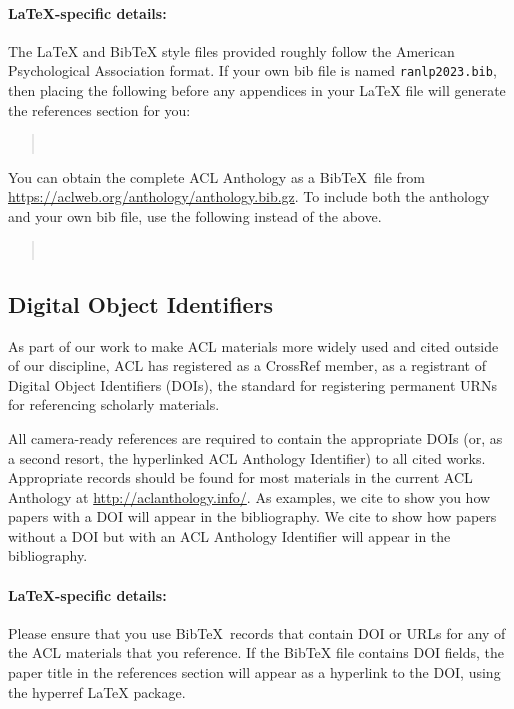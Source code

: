 \documentclass[11pt,a4paper]{article}
\begin{document}
\paragraph{\LaTeX-specific details:}
The \LaTeX{} and Bib\TeX{} style files provided roughly follow the American Psychological Association format.
If your own bib file is named \texttt{\small ranlp2023.bib}, then placing the following before any appendices in your \LaTeX{}  file will generate the references section for you:
\begin{quote}\small
\verb||\\
\verb||
\end{quote}

You can obtain the complete ACL Anthology as a Bib\TeX\ file from \url{https://aclweb.org/anthology/anthology.bib.gz}.
To include both the anthology and your own bib file, use the following instead of the above.
\begin{quote}\small
\verb||\\
\verb||
\end{quote}


\subsection{Digital Object Identifiers}
As part of our work to make ACL materials more widely used and cited outside of our discipline, ACL has registered as a CrossRef member, as a registrant of Digital Object Identifiers (DOIs), the standard for registering permanent URNs for referencing scholarly materials.

All camera-ready references are required to contain the appropriate DOIs (or, as a second resort, the hyperlinked ACL Anthology Identifier) to all cited works.
Appropriate records should be found for most materials in the current ACL Anthology at \url{http://aclanthology.info/}.
As examples, we cite \citep{goodman-etal-2016-noise} to show you how papers with a DOI will appear in the bibliography.
We cite \citep{harper-2014-learning} to show how papers without a DOI but with an ACL Anthology Identifier will appear in the bibliography.

\paragraph{\LaTeX-specific details:}
Please ensure that you use Bib\TeX\ records that contain DOI or URLs for any of the ACL materials that you reference.
If the Bib\TeX{} file contains DOI fields, the paper title in the references section will appear as a hyperlink to the DOI, using the hyperref \LaTeX{} package.
\end{document}
